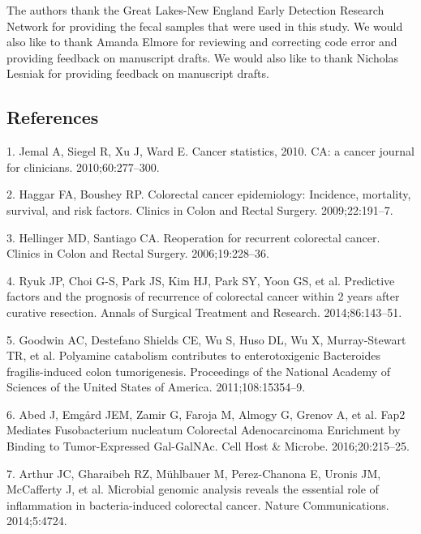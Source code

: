\documentclass[12pt,]{article}
\begin{document}
The authors thank the Great Lakes-New England Early Detection Research
Network for providing the fecal samples that were used in this study. We
would also like to thank Amanda Elmore for reviewing and correcting code
error and providing feedback on manuscript drafts. We would also like to
thank Nicholas Lesniak for providing feedback on manuscript drafts.

\newpage

\subsection*{References}\label{references}

\hypertarget{refs}{}
\hypertarget{ref-jemal_cancer_2010}{}
1. Jemal A, Siegel R, Xu J, Ward E. Cancer statistics, 2010. CA: a
cancer journal for clinicians. 2010;60:277--300.

\hypertarget{ref-haggar_colorectal_2009}{}
2. Haggar FA, Boushey RP. Colorectal cancer epidemiology: Incidence,
mortality, survival, and risk factors. Clinics in Colon and Rectal
Surgery. 2009;22:191--7.

\hypertarget{ref-hellinger_reoperation_2006}{}
3. Hellinger MD, Santiago CA. Reoperation for recurrent colorectal
cancer. Clinics in Colon and Rectal Surgery. 2006;19:228--36.

\hypertarget{ref-ryuk_predictive_2014}{}
4. Ryuk JP, Choi G-S, Park JS, Kim HJ, Park SY, Yoon GS, et al.
Predictive factors and the prognosis of recurrence of colorectal cancer
within 2 years after curative resection. Annals of Surgical Treatment
and Research. 2014;86:143--51.

\hypertarget{ref-goodwin_polyamine_2011}{}
5. Goodwin AC, Destefano Shields CE, Wu S, Huso DL, Wu X, Murray-Stewart
TR, et al. Polyamine catabolism contributes to enterotoxigenic
Bacteroides fragilis-induced colon tumorigenesis. Proceedings of the
National Academy of Sciences of the United States of America.
2011;108:15354--9.

\hypertarget{ref-abed_fap2_2016}{}
6. Abed J, Emgård JEM, Zamir G, Faroja M, Almogy G, Grenov A, et al.
Fap2 Mediates Fusobacterium nucleatum Colorectal Adenocarcinoma
Enrichment by Binding to Tumor-Expressed Gal-GalNAc. Cell Host \&
Microbe. 2016;20:215--25.

\hypertarget{ref-arthur_microbial_2014}{}
7. Arthur JC, Gharaibeh RZ, Mühlbauer M, Perez-Chanona E, Uronis JM,
McCafferty J, et al. Microbial genomic analysis reveals the essential
role of inflammation in bacteria-induced colorectal cancer. Nature
Communications. 2014;5:4724.
\end{document}
